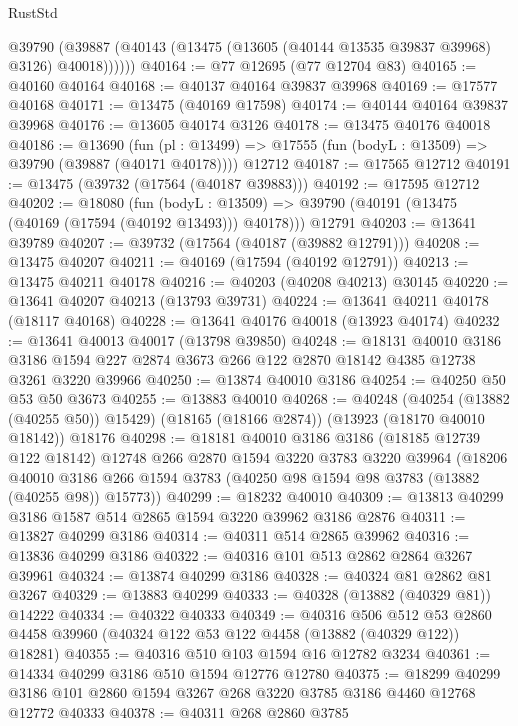 \begin{lexlean}{RustStd}
\begin{coremodule}
        @39790 (@39887 (@40143 (@13475 (@13605 (@40144 @13535 @39837 @39968) @3126) @40018))))))
@40164 := @77 @12695 (@77 @12704 @83)
@40165 := @40160 @40164
@40168 := @40137 @40164 @39837 @39968
@40169 := @17577 @40168
@40171 := @13475 (@40169 @17598)
@40174 := @40144 @40164 @39837 @39968
@40176 := @13605 @40174 @3126
@40178 := @13475 @40176 @40018
@40186 := @13690
    (fun (pl : @13499) => @17555 (fun (bodyL : @13509) => @39790 (@39887 (@40171 @40178))))
    @12712
@40187 := @17565 @12712
@40191 := @13475 (@39732 (@17564 (@40187 @39883)))
@40192 := @17595 @12712
@40202 := @18080
    (fun (bodyL : @13509) => @39790 (@40191 (@13475 (@40169 (@17594 (@40192 @13493))) @40178)))
    @12791
@40203 := @13641 @39789
@40207 := @39732 (@17564 (@40187 (@39882 @12791)))
@40208 := @13475 @40207
@40211 := @40169 (@17594 (@40192 @12791))
@40213 := @13475 @40211 @40178
@40216 := @40203 (@40208 @40213) @30145
@40220 := @13641 @40207 @40213 (@13793 @39731)
@40224 := @13641 @40211 @40178 (@18117 @40168)
@40228 := @13641 @40176 @40018 (@13923 @40174)
@40232 := @13641 @40013 @40017 (@13798 @39850)
@40248 := @18131
    @40010
    @3186
    @3186
    @1594
    @227
    @2874
    @3673
    @266
    @122
    @2870
    @18142
    @4385
    @12738
    @3261
    @3220
    @39966
@40250 := @13874 @40010 @3186
@40254 := @40250 @50 @53 @50 @3673
@40255 := @13883 @40010
@40268 := @40248
    (@40254 (@13882 (@40255 @50)) @15429)
    (@18165 (@18166 @2874))
    (@13923 (@18170 @40010 @18142))
    @18176
@40298 := @18181
    @40010
    @3186
    @3186
    (@18185 @12739 @122 @18142)
    @12748
    @266
    @2870
    @1594
    @3220
    @3783
    @3220
    @39964
    (@18206 @40010 @3186 @266 @1594 @3783 (@40250 @98 @1594 @98 @3783 (@13882 (@40255 @98)) @15773))
@40299 := @18232 @40010
@40309 := @13813 @40299 @3186 @1587 @514 @2865 @1594 @3220 @39962 @3186 @2876
@40311 := @13827 @40299 @3186
@40314 := @40311 @514 @2865 @39962
@40316 := @13836 @40299 @3186
@40322 := @40316 @101 @513 @2862 @2864 @3267 @39961
@40324 := @13874 @40299 @3186
@40328 := @40324 @81 @2862 @81 @3267
@40329 := @13883 @40299
@40333 := @40328 (@13882 (@40329 @81)) @14222
@40334 := @40322 @40333
@40349 := @40316
    @506
    @512
    @53
    @2860
    @4458
    @39960
    (@40324 @122 @53 @122 @4458 (@13882 (@40329 @122)) @18281)
@40355 := @40316 @510 @103 @1594 @16 @12782 @3234
@40361 := @14334 @40299 @3186 @510 @1594 @12776 @12780
@40375 := @18299
    @40299
    @3186
    @101
    @2860
    @1594
    @3267
    @268
    @3220
    @3785
    @3186
    @4460
    @12768
    @12772
    @40333
@40378 := @40311 @268 @2860 @3785

\end{coremodule}
\end{lexlean}
